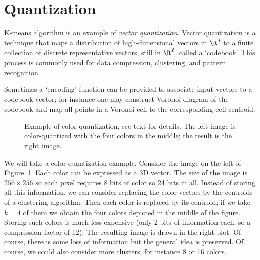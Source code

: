 \section{Quantization}

K-means algorithm is an example of \emph{vector quantization}. Vector
quantization is a technique that maps a distribution of high-dimensional
vectors in $\R^d$ to a finite collection of discrete representative vectors,
still in $\R^d$, called a `codebook'. This process is commonly used for data
compression, clustering, and pattern recognition.

Sometimes a `encoding' function can be provided to associate input vectors to
a codebook vector; for instance one may construct Voronoi diagram of the
codebook and map all points in a Voronoi cell to the corresponding cell
centroid.

\begin{figure}[h]\centering
\caption{Example of color quantization, see text for details. The left image
is color-quantized with the four colors in the middle; the result is the
right image.}
\label{fig:ch8-color-quant}
\end{figure}

\begin{example}
We will take a color quantization example. Consider the image on the left of
Figure~\ref{fig:ch8-color-quant}. Each color can be expressed as a 3D vector.
The size of the image is $256 \times 256$ so each pixel requires 8 bits of
color so 24 bits in all. Instead of storing all this information, we can
consider replacing the color vectors by the centroids of a clustering
algorithm. Then each color is replaced by its centroid; if we take $k = 4$ of
them we obtain the four colors depicted in the middle of the figure. Storing
such colors is much less expensive (only 2 bits of information each, so a
compression factor of 12). The resulting image is drawn in the right plot. Of
course, there is some loss of information but the general idea is preserved.
Of course, we could also consider more clusters, for instance 8 or 16 colors.
\end{example}


